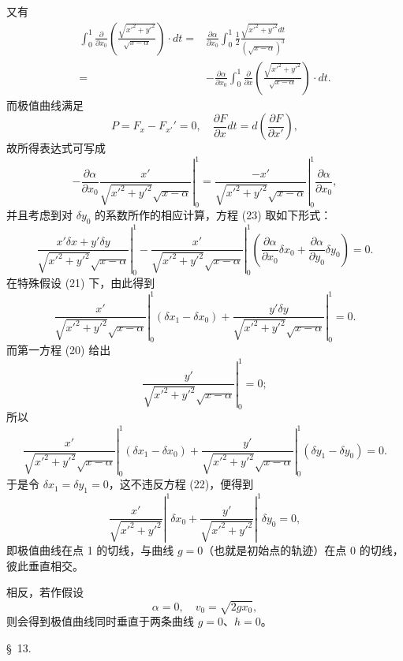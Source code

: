 \documentclass[11pt,a4paper,leqno]{article}
\begin{document}
又有
\[
\begin{split}
\int_0^1\frac{\partial}{\partial x_0}\left(\frac{\sqrt{x'^2+y'^2}}{\sqrt{x-\alpha}}\right)\cdot dt
={}&\frac{\partial\alpha}{\partial x_0}\int_0^1\frac{1}{2}\frac{\sqrt{x'^2+y'^2}dt}{(\sqrt{x-\alpha})^3}\\
={}&-\frac{\partial\alpha}{\partial x_0}\int_0^1\frac{\partial}{\partial x}\left(\frac{\sqrt{x'^2+y'^2}}{\sqrt{x-\alpha}}\right)\cdot dt.
\end{split}
\]
而极值曲线满足
\[
P=F_x-F_{x'}'=0,\quad \frac{\partial F}{\partial x}dt=d\left(\frac{\partial F}{\partial x'}\right),
\]
故所得表达式可写成
\[
-\frac{\partial\alpha}{\partial x_0}\left.\frac{x'}{\sqrt{x'^2+y'^2}\sqrt{x-\alpha}}\right|_0^1
=\left.\frac{-x'}{\sqrt{x'^2+y'^2}\sqrt{x-\alpha}}\right|_0^1\frac{\partial\alpha}{\partial x_0},
\]
并且考虑到对 $\delta y_0$ 的系数所作的相应计算，方程 (23) 取如下形式：
\[
\left.\frac{x'\delta x+y'\delta y}{\sqrt{x'^2+y'^2}\sqrt{x-\alpha}}\right|_0^1
-\left.\frac{x'}{\sqrt{x'^2+y'^2}\sqrt{x-\alpha}}\right|_0^1\left(\frac{\partial\alpha}{\partial x_0}\delta x_0+\frac{\partial\alpha}{\partial y_0}\delta y_0\right)=0.
\]
在特殊假设 (21) 下，由此得到
\[
\left.\frac{x'}{\sqrt{x'^2+y'^2}\sqrt{x-\alpha}}\right|_0^1(\delta x_1-\delta x_0)
+\left.\frac{y'\delta y}{\sqrt{x'^2+y'^2}\sqrt{x-\alpha}}\right|_0^1=0.
\]
而第一方程 (20) 给出
\[
\left.\frac{y'}{\sqrt{x'^2+y'^2}\sqrt{x-\alpha}}\right|_0^1=0;
\]
所以
\[
\left.\frac{x'}{\sqrt{x'^2+y'^2}\sqrt{x-\alpha}}\right|_0^1(\delta x_1-\delta x_0)
+\left.\frac{y'}{\sqrt{x'^2+y'^2}\sqrt{x-\alpha}}\right|_0^1(\delta y_1-\delta y_0)=0.
\]
于是令 $\delta x_1=\delta y_1=0$，这不违反方程 (22)，便得到
\[
\left.\frac{x'}{\sqrt{x'^2+y'^2}}\right|^1\delta x_0+
\left.\frac{y'}{\sqrt{x'^2+y'^2}}\right|^1\delta y_0=0,
\]
即极值曲线在点 1 的切线，与曲线 $g=0$（也就是初始点的轨迹）在点 0 的切线，彼此垂直相交。

相反，若作假设
\[
\alpha=0,\quad v_0=\sqrt{2gx_0},
\]
则会得到极值曲线同时垂直于两条曲线 $g=0$、$h=0$。

\begin{center}{\large \S~13.}\end{center}
\end{document}
